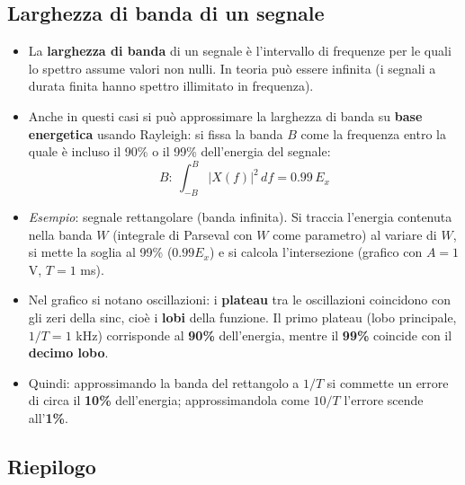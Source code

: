 \documentclass[12pt, a4paper]{article}
\begin{document}
\subsection{Larghezza di banda di un segnale}
\begin{itemize}
    \item La \textbf{larghezza di banda} di un segnale è l'intervallo di frequenze per le quali lo spettro assume valori non nulli. In teoria può essere infinita (i segnali a durata finita hanno spettro illimitato in frequenza).
    \item Anche in questi casi si può approssimare la larghezza di banda su \textbf{base energetica} usando Rayleigh: si fissa la banda $B$ come la frequenza entro la quale è incluso il 90\% o il 99\% dell'energia del segnale:
    $$B:\ \int_{-B}^{B}|X(f)|^2\,df=0.99\,E_x$$
    \item \textit{Esempio}: segnale rettangolare (banda infinita). Si traccia l'energia contenuta nella banda $W$ (integrale di Parseval con $W$ come parametro) al variare di $W$, si mette la soglia al 99\% ($0.99E_x$) e si calcola l'intersezione (grafico con $A=1$ V, $T=1$ ms).
    \item Nel grafico si notano oscillazioni: i \textbf{plateau} tra le oscillazioni coincidono con gli zeri della sinc, cioè i \textbf{lobi} della funzione. Il primo plateau (lobo principale, $1/T=1$ kHz) corrisponde al \textbf{90\%} dell'energia, mentre il \textbf{99\%} coincide con il \textbf{decimo lobo}.
    \item Quindi: approssimando la banda del rettangolo a $1/T$ si commette un errore di circa il \textbf{10\%} dell'energia; approssimandola come $10/T$ l'errore scende all'\textbf{1\%}.
\end{itemize}

\subsection{Riepilogo}
\end{document}
